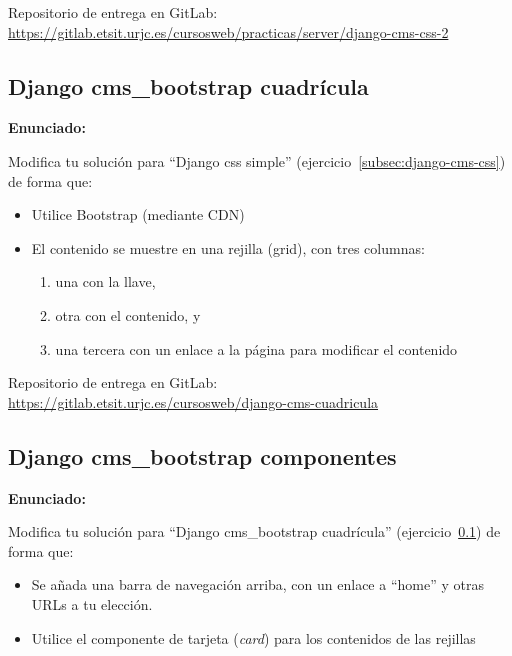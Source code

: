Repositorio de entrega en GitLab: \\
\url{https://gitlab.etsit.urjc.es/cursosweb/practicas/server/django-cms-css-2}


\subsection{Django cms\_bootstrap cuadrícula}
\label{subsec:django-cms-bootstrap-1}

\textbf{Enunciado:}

Modifica tu solución para ``Django css simple'' (ejercicio~\ref{subsec:django-cms-css}) de forma que:

\begin{itemize}
  \item Utilice Bootstrap (mediante CDN)
  \item El contenido se muestre en una rejilla (grid), con tres columnas:
  \begin{enumerate}
    \item una con la llave, 
    \item otra con el contenido, y
    \item una tercera con un enlace a la página para modificar el contenido
  \end{enumerate}
\end{itemize}


Repositorio de entrega en GitLab: \\
\url{https://gitlab.etsit.urjc.es/cursosweb/django-cms-cuadricula}


\subsection{Django cms\_bootstrap componentes}
\label{subsec:django-cms-bootstrap-2}

\textbf{Enunciado:}

Modifica tu solución para ``Django cms\_bootstrap cuadrícula'' (ejercicio~\ref{subsec:django-cms-bootstrap-1}) de forma que:

\begin{itemize}
  \item Se añada una barra de navegación arriba, con un enlace a ``home'' y otras URLs a tu elección.
  \item Utilice el componente de tarjeta (\emph{card}) para los contenidos de las rejillas
\end{itemize}


